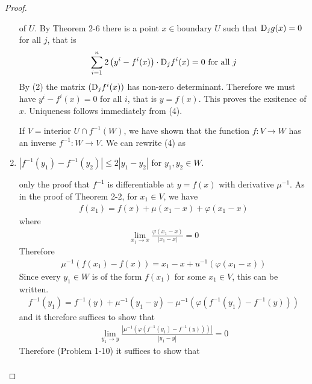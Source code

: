 \begin{proof}
\begin{enumerate}[label={\upshape(\arabic*)}]
            of $U$. By Theorem 2-6 there is a point $x\in\text{boundary } U$ such that $\mathrm{D}_jg(x) = 0$ for all 
            $j$, that is 
            \begin{align*}
                \sum_{i=1}^{n}{2\left(y^i - f^i(x)\right)\cdot \mathrm{D}_jf^i(x)} = 0 \text{ for all } j 
            \end{align*}
            By (2) the matrix $(\mathrm{D}_jf^i(x))$ has non-zero determinant. Therefore we must have $y^i - f^i(x) = 0$
            for all $i$, that is $y=f(x)$. This proves the exsitence of $x$. Uniqueness follows immediately 
            from (4). 

            If $V = \text{interior } U \cap f^{-1}(W)$, we have shown that the function 
            $f:V\to W$ has an inverse $f^{-1}:W\to V$. We can rewrite (4) as 
        \item $|f^{-1}(y_1) - f^{-1}(y_2)| \le 2|y_1 - y_2|$ for $y_1, y_2\in W$.\par 
            only the proof that $f^{-1}$ is differentiable at $y=f(x)$ with derivative 
            $\mu^{-1}$. As in the proof of Theorem 2-2, for $x_1\in V$, we have
            \begin{align*}
                f(x_1) = f(x) + \mu(x_1 - x) + \varphi(x_1 - x)
            \end{align*}
            where 
            \begin{align*}
                \lim_{x_1\to x}{\frac{\varphi(x_1 - x)}{|x_1 - x|}} = 0
            \end{align*}
            Therefore 
            \begin{align*}
                \mu^{-1}\left(f(x_1) - f(x)\right) = x_1 - x + u^{-1}\left(\varphi(x_1 - x)\right)
            \end{align*}
            Since every $y_1\in W$ is of the form $f(x_1)$ for some $x_1\in V$, this can be written.
            \begin{align*}
                f^{-1}(y_1) = f^{-1}(y) + \mu^{-1}(y_1 - y) - \mu^{-1}\left(\varphi(f^{-1}(y_1) - f^{-1}(y))\right)
            \end{align*}
            and it therefore suffices to show that
            \begin{align*}
                \lim_{y_1\to y}\frac{\left|\mu^{-1}(\varphi(f^{-1}(y_1)-f^{-1}(y)))\right|}{|y_1-y|} = 0   
            \end{align*}
            Therefore (Problem 1-10) it suffices to show that
            \begin{align*}

\end{align*}
\end{enumerate}
\end{proof}
